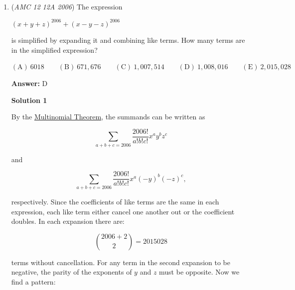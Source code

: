 \begin{enumerate}
 
 \[A^2(S)=\left(\frac{a_1+2a_2+a_3}{4},\frac{a_2+2a_3+a_4}{4},\dots,\frac{a_{n-2}+2a_{n-1}+a_n}{4}\right).\]Thus for $m = 1\text{ and }2$, the coefficients of the terms in the numerator of $A^m(S)$ are the binomial coefficients $\binom{m}{0},\binom{m}{1},\dots,\binom{m}{m}$, and the denominator is $2^m$. Because $\binom{m}{r}+\binom{m}{r+1}=\binom{m+1}{r+1}$ for all integers $r\geq 0$, the coefficients of the terms in the numerators of $A^{m+1}(S)$ are $\binom{m+1}{0},\binom{m+1}{1},\ldots,\binom{m+1}{m+1}$ for $2\leq m\leq n-2$. The definition implies that the denominator of each term in $A^{m+1}(S)$ is $2^{m+1}$. For the given sequence, the sole term in $A^{100}(S)$ is 
 \[\frac{1}{2^{100}} \sum_{m=0}^{100} \binom{100}{m}a_{m+1} = \frac{1}{2^{100}} \sum_{m=0}^{100} \binom{100}{m}x^m = \frac{1}{2^{100}}(x+1)^{100}.\]Therefore, 
 \[\left(\frac{1}{2^{50}}\right)=A^{100}(S)=\left(\frac{(1+x)^{100}}{2^{100}}\right),\]so $(1+x)^{100}=2^{50}$, and because $x>0$, we have $x=\boxed{\sqrt{2}-1}$.- Alcumus

 


	\item (\textit{AMC 12 12A 2006}) The expression 


 $(x+y+z)^{2006}+(x-y-z)^{2006}$


 is simplified by expanding it and combining like terms. How many terms are in the simplified expression?


 $\mathrm{(A) \ } 6018\qquad \mathrm{(B) \ } 671,676\qquad \mathrm{(C) \ } 1,007,514\qquad \mathrm{(D) \ } 1,008,016\qquad \mathrm{(E) \ }  2,015,028$

 \textbf{Answer: }D



\textbf{Solution 1}

By the \href{https://artofproblemsolving.com/wiki/index.php?title=Multinomial\_Theorem}{Multinomial Theorem}, the summands can be written as

 
 \[\sum_{a+b+c=2006}{\frac{2006!}{a!b!c!}x^ay^bz^c}\]

 and

 
 \[\sum_{a+b+c=2006}{\frac{2006!}{a!b!c!}x^a(-y)^b(-z)^c},\]

 respectively. Since the coefficients of like terms are the same in each expression, each like term either cancel one another out or the coefficient doubles. In each expansion there are:

 
 \[{2006+2\choose 2} = 2015028\]

 terms without cancellation. For any term in the second expansion to be negative, the parity of the exponents of $y$ and $z$ must be opposite. Now we find a pattern:


\end{enumerate}
